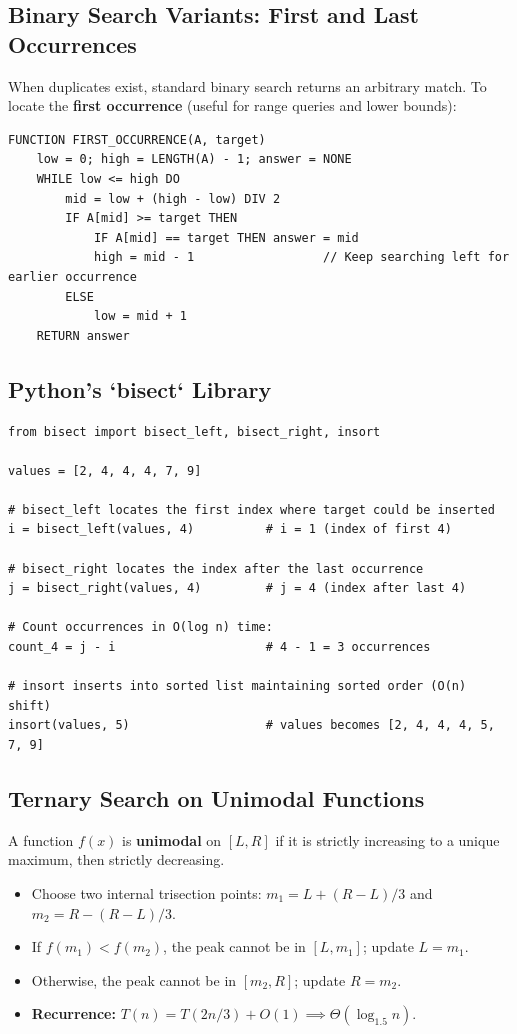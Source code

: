 \documentclass[11pt,a4paper]{article}
\begin{document}
\subsection{Binary Search Variants: First and Last Occurrences}
When duplicates exist, standard binary search returns an arbitrary match. To locate the \textbf{first occurrence} (useful for range queries and lower bounds):
\begin{lstlisting}[style=pseudostyle]
FUNCTION FIRST_OCCURRENCE(A, target)
    low = 0; high = LENGTH(A) - 1; answer = NONE
    WHILE low <= high DO
        mid = low + (high - low) DIV 2
        IF A[mid] >= target THEN
            IF A[mid] == target THEN answer = mid
            high = mid - 1                  // Keep searching left for earlier occurrence
        ELSE
            low = mid + 1
    RETURN answer
\end{lstlisting}

\subsection{Python's `bisect` Library}
\begin{lstlisting}[style=pythonstyle]
from bisect import bisect_left, bisect_right, insort

values = [2, 4, 4, 4, 7, 9]

# bisect_left locates the first index where target could be inserted
i = bisect_left(values, 4)          # i = 1 (index of first 4)

# bisect_right locates the index after the last occurrence
j = bisect_right(values, 4)         # j = 4 (index after last 4)

# Count occurrences in O(log n) time:
count_4 = j - i                     # 4 - 1 = 3 occurrences

# insort inserts into sorted list maintaining sorted order (O(n) shift)
insort(values, 5)                   # values becomes [2, 4, 4, 4, 5, 7, 9]
\end{lstlisting}

\subsection{Ternary Search on Unimodal Functions}
A function $f(x)$ is \textbf{unimodal} on $[L, R]$ if it is strictly increasing to a unique maximum, then strictly decreasing.
\begin{itemize}[itemsep=1pt]
    \item Choose two internal trisection points: $m_1 = L + (R - L)/3$ and $m_2 = R - (R - L)/3$.
    \item If $f(m_1) < f(m_2)$, the peak cannot be in $[L, m_1]$; update $L = m_1$.
    \item Otherwise, the peak cannot be in $[m_2, R]$; update $R = m_2$.
    \item \textbf{Recurrence:} $T(n) = T(2n/3) + O(1) \implies \Theta(\log_{1.5} n)$.
\end{itemize}
\end{document}
